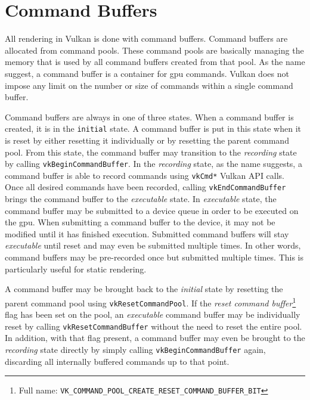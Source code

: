 
  \section{Command Buffers}
  \label{sec:CommandBuffers}
    All rendering in Vulkan is done with command buffers.
    Command buffers are allocated from command pools.
    These command pools are basically managing the memory that is used by all command buffers created from that pool.
    As the name suggest, a command buffer is a container for \gls{gpu} commands.
    Vulkan does not impose any limit on the number or size of commands within a single command buffer.

    Command buffers are always in one of three states.
    When a command buffer is created, it is in the \texttt{initial} state.
    A command buffer is put in this state when it is reset by either resetting it individually or by resetting the parent command pool.
    From this state, the command buffer may transition to the \textit{recording} state by calling \lstinline{vkBeginCommandBuffer}.
    In the \textit{recording} state, as the name suggests, a command buffer is able to record commands using \lstinline{vkCmd*} Vulkan API calls.
    Once all desired commands have been recorded, calling \lstinline{vkEndCommandBuffer} brings the command buffer to the \textit{executable} state.
    In \textit{executable} state, the command buffer may be submitted to a device queue in order to be executed on the \gls{gpu}.
    When submitting a command buffer to the device, it may not be modified until it has finished execution.
    Submitted command buffers will stay \textit{executable} until reset and may even be submitted multiple times.
    In other words, command buffers may be pre-recorded once but submitted multiple times.
    This is particularly useful for static rendering.

    A command buffer may be brought back to the \textit{initial} state by resetting the parent command pool using \lstinline{vkResetCommandPool}.
    If the \textit{reset command buffer}\footnote{Full name: \lstinline{VK_COMMAND_POOL_CREATE_RESET_COMMAND_BUFFER_BIT}} flag has been set on the pool, an \textit{executable} command buffer may be individually reset by calling \lstinline{vkResetCommandBuffer} without the need to reset the entire pool.
    In addition, with that flag present, a command buffer may even be brought to the \textit{recording} state directly by simply calling \lstinline{vkBeginCommandBuffer} again, discarding all internally buffered commands up to that point.


